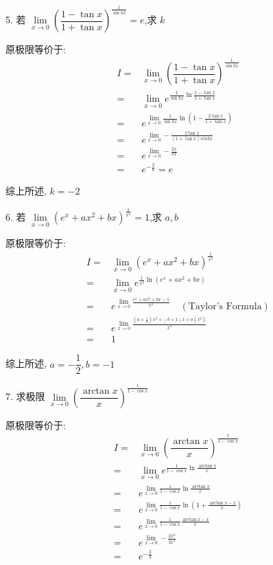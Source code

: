 5. 若 $\lim\limits_{x\to 0}\left(\dfrac{1-\tan x}{1+\tan x}\right)^{\frac{1}{\sin kx}}=e$,求 $k$
\begin{solution}
	
	原极限等价于:
	\begin{align*}
		I = & \lim\limits_{x\to 0}\left(\dfrac{1-\tan x}{1+\tan x} \right)^{\frac{1}{\sin kx}} \\
		  = & \lim\limits_{x\to 0}e^{\frac{1}{\sin kx}\ln\frac{1-\tan x}{1+\tan x}}\\
		  = & e^{\lim\limits_{x\to 0}\frac{1}{\sin kx}\ln(1-\frac{2\tan x}{1+\tan x})}\\
		  = & e^{\lim\limits_{x\to 0}-\frac{2\tan x}{(1+\tan x)sin kx}}\\
		  = & e^{\lim\limits_{x\to 0}-\frac{2x}{kx}}\\
		  = & e^{-\frac{2}{k}} = e
	\end{align*}

	综上所述, $k = -2$
\end{solution}

6.  若 $\lim\limits_{x\to 0}(e^{x}+ax^{2}+bx)^{\frac{1}{x^{2}}}=1$,求 $a,b$
\begin{solution}
	
	原极限等价于:
	\begin{align*}
		I = & \lim\limits_{x\to 0}(e^{x}+ax^{2}+bx)^{\frac{1}{x^{2}}}\\
		  = & \lim\limits_{x\to 0}e^{\frac{1}{x^{2}}\ln(e^{x}+ax^{2}+bx)}\\
		  = & e^{\lim\limits_{x\to 0}\frac{e^{x}+ax^{2}+bx-1}{x^{2}}}\quad (\text{Taylor's Formula})\\
		  = & e^{\lim\limits_{x\to 0}\frac{(a+\frac{1}{2})x^{2}+(b+1)x+o(x^{2})}{x^{2}}}\\
		  = & 1
	\end{align*}

	综上所述, $a = -\dfrac{1}{2}, b = -1$
\end{solution}

7. 求极限 $\lim\limits_{x\to 0}\left(\dfrac{\arctan x}{x}\right)^{\frac{1}{1-\cos x}}$
\begin{solution}
	
	原极限等价于:
	\begin{align*}
		I = & \lim\limits_{x\to 0}\left(\dfrac{\arctan x}{x}\right)^{\frac{1}{1-\cos x}}\\
		  = & \lim\limits_{x\to 0}e^{\frac{1}{1-\cos x}\ln\frac{\arctan x}{x}}\\
		  = & e^{\lim\limits_{x\to 0}\frac{1}{1-\cos x}\ln\frac{\arctan x}{x}}\\
		  = & e^{\lim\limits_{x\to 0}\frac{1}{1-\cos x}\ln(1+\frac{\arctan x-x}{x})}\\
		  = & e^{\lim\limits_{x\to 0}\frac{1}{1-\cos x}\frac{\arctan x-x}{x}}\\
		  = & e^{\lim\limits_{x\to 0}-\frac{2x^{3}}{3x^{3}}}\\
		  = & e^{-\frac{2}{3}}
	\end{align*}
\end{solution}

